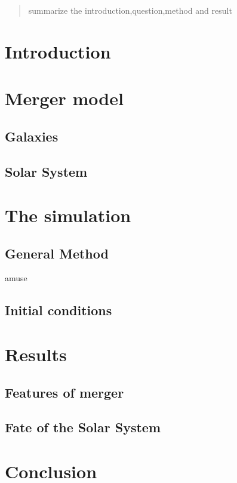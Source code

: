 \documentclass[a4paper,12pt]{article}
\begin{document}
\vfill 
\begin{abstract}
summarize the introduction,question,method and result
\end{abstract}

\newpage

\vspace{2em}
\setcounter{tocdepth}{2} 
\tableofcontents 

\newpage 



\section{Introduction} 

\section{Merger model}
\subsection{Galaxies}
\subsection{Solar System}

\section{The simulation}
\subsection{General Method}
amuse
\subsection{Initial conditions}

\section{Results}
\subsection{Features of merger}
\subsection{Fate of the Solar System}

\section{Conclusion}
\end{document}
